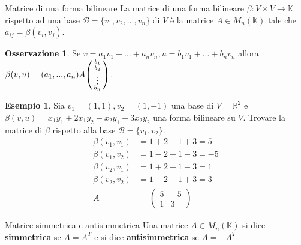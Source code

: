 \documentclass[a4paper]{article}
\theoremstyle{definition}
\newtheorem*{oss}{Osservazione}
\newtheorem*{es}{Esempio}
\begin{document}
	\begin{deff}{Matrice di una forma bilineare}{}
		La matrice di una forma bilineare $\beta: V \times V \to \mathbb{K}$ rispetto ad una base $\mathcal{B} = \{v_1, v_2, ..., v_n\}$ di $V$
		è la matrice $A \in M_n(\mathbb{K})$ tale che $a_{ij} = \beta(v_i, v_j)$.
	\end{deff}
	\begin{oss}
		Se $v = a_1v_1 + ... + a_nv_n, u = b_1v_1 + ... + b_nv_n$ allora $\beta(v, u) = (a_1, ..., a_n)A \begin{psmallmatrix}
			b_1 \\
			b_2 \\
			\vdots \\
			b_n
		\end{psmallmatrix}$.
	\end{oss}

	\begin{es}
		Sia $v_1 = (1, 1), v_2 = (1, -1)$ una base di $V = \mathbb{R}^2$ e $\beta(v, u) = x_1y_1 + 2x_1y_2 - x_2y_1 + 3x_2y_2$ una forma bilineare su $V$.
		Trovare la matrice di $\beta$ rispetto alla base $\mathcal{B} = \{v_1, v_2\}$.
		\begin{align*}
			\beta(v_1, v_1) &= 1 + 2 - 1 + 3 = 5 \\
			\beta(v_1, v_2) &= 1 - 2 - 1 - 3 = - 5 \\
			\beta(v_2, v_1) &= 1 + 2 + 1 - 3 = 1 \\
			\beta(v_2, v_2) &= 1 - 2 + 1 + 3 = 3 \\
			A &= \begin{pmatrix}
				5 & -5 \\
				1 & 3
			\end{pmatrix}
		\end{align*}
	\end{es}

	\begin{deff}{Matrice simmetrica e antisimmetrica}{}
		Una matrice $A \in M_n(\mathbb{K})$ si dice \textbf{simmetrica} se $A = A^T$ e si dice \textbf{antisimmetrica} se $A = -A^T$.
	\end{deff}
\end{document}
